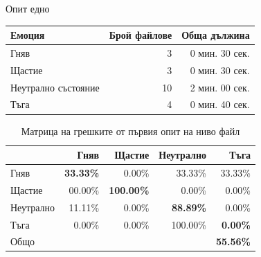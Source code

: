 \documentclass[9pt]{beamer}
\begin{document}
    \begin{frame}[t]{Опит едно}
        \pause
        \begin{center}
        \begin{tabular}{|l|r|r|} 
            \hline
            Емоция & Брой файлове & Обща дължина\\ 
            \hline
            Гняв & 3 & 0 мин. 30 сек.\\ 
            Щастие & 3 & 0 мин. 30 сек.\\ 
            Неутрално състояние & 10 & 2 мин. 00 сек. \\ 
            Тъга & 4 & 0 мин. 40 сек. \\ 
            \hline
        \end{tabular}
        \pause
        \begin{table}[h]
            \begin{center}
            \begin{tabular}{|l|r r r r|} 
                \hline
                & Гняв & Щастие & Неутрално & Тъга \\ 
                \hline
                Гняв &  \textbf{33.33\%} & 0.00\% & 33.33\% & 33.33\% \\ 
                Щастие & 00.00\% & \textbf{100.00\%} & 0.00\% & 0.00\% \\ 
                Неутрално & 11.11\% & 0.00\% & \textbf{88.89\%} & 0.00\% \\ 
                Тъга & 0.00\% & 0.00\% & 100.00\% & \textbf{0.00\%}\\ 
                \hline
                \hline
                Общо & & & & \textbf{55.56\%}\\
                \hline
            \end{tabular}
            \caption*{Матрица на грешките от първия опит на ниво файл}
            \end{center}
        \end{table}
        \end{center}
    \end{frame}
\end{document}
